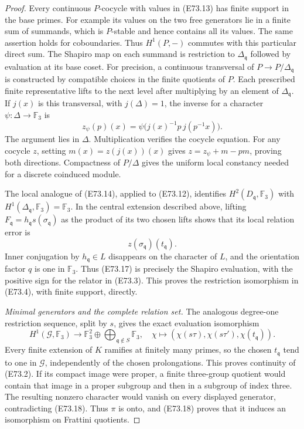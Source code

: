 \begin{proof}
Every continuous $P$-cocycle with values in (E73.13)
has finite support in the base primes. For example its
values on the two free generators lie in a finite
sum of summands, which is $P$-stable and hence
contains all its values. The same assertion holds
for coboundaries. Thus $H^1(P,-)$ commutes with this
particular direct sum. The Shapiro map on each
summand is restriction to $\Delta_{\mathfrak q}$
followed by evaluation at its base coset.
For precision, a continuous transversal of
$P\to P/\Delta_{\mathfrak q}$ is constructed by
compatible choices in the finite quotients of $P$.
Each prescribed finite representative lifts to the
next level after multiplying by an element of
$\Delta_{\mathfrak q}$. If $j(x)$ is this transversal,
with $j(\Delta)=1$, the inverse for a character
$\psi:\Delta\to\mathbb F_3$ is
\[
 z_\psi(p)(x)
   =\psi\bigl(j(x)^{-1}p\,j(p^{-1}x)\bigr).
 \tag{E73.16}
\]
The argument lies in $\Delta$. Multiplication verifies
the cocycle equation. For any cocycle $z$, setting
$m(x)=z(j(x))(x)$ gives
$z=z_\psi+m-pm$, proving both directions. Compactness
of $P/\Delta$ gives the uniform local constancy needed
for a discrete coinduced module.

The local analogue of (E73.14), applied to (E73.12),
identifies $H^2(D_{\mathfrak q},\mathbb F_3)$ with
$H^1(\Delta_{\mathfrak q},\mathbb F_3)=\mathbb F_3$.
In the central extension described above, lifting
$F_{\mathfrak q}=h_{\mathfrak q}s(\sigma_{\mathfrak q})$
as the product of its two chosen lifts shows that
its local relation error is
\[
                  z(\sigma_{\mathfrak q})(t_{\mathfrak q}).
 \tag{E73.17}
\]
Inner conjugation by $h_{\mathfrak q}\in L$ disappears
on the character of $L$, and the orientation factor
$q$ is one in $\mathbb F_3$. Thus (E73.17) is precisely
the Shapiro evaluation, with the positive sign for
the relator in (E73.3). This proves the restriction
isomorphism in (E73.4), with finite support, directly.

\emph{Minimal generators and the complete relation set.}
The analogous degree-one restriction sequence, split
by $s$, gives the exact evaluation isomorphism
\[
 H^1(\mathcal G,\mathbb F_3)
   \longrightarrow\mathbb F_3^2\oplus
                  \bigoplus_{\mathfrak q\notin S}\mathbb F_3,
 \quad \chi\longmapsto
    (\chi(s\tau),\chi(s\tau'),\chi(t_{\mathfrak q})).
 \tag{E73.18}
\]
Every finite extension of $K$ ramifies at finitely
many primes, so the chosen $t_{\mathfrak q}$ tend
to one in $\mathcal G$, independently of the
chosen prolongations. This proves continuity of
(E73.2). If its compact image were proper, a finite
three-group quotient would contain that image in a
proper subgroup and then in a subgroup of index
three. The resulting nonzero character would
vanish on every displayed generator, contradicting
(E73.18). Thus $\pi$ is onto, and (E73.18) proves
that it induces an isomorphism on Frattini quotients.


\end{proof}
